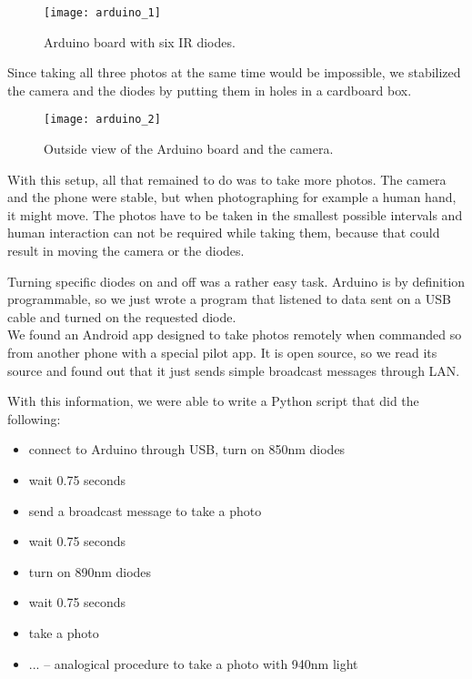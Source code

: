             \begin{figure}[H]
                \caption{Arduino board with six IR diodes.}
                \centering
                \texttt{[image: arduino\_1]}
                \label{fig:arduino_1}
            \end{figure}

            Since taking all three photos at the same time would be impossible,
            we stabilized the camera and the diodes by putting them in holes
            in a cardboard box.

            \begin{figure}[H]
                \caption{Outside view of the Arduino board and the camera.}
                \centering
                \texttt{[image: arduino\_2]}
                \label{fig:arduino_2}
            \end{figure}

            With this setup, all that remained to do was to take more photos.
            The camera and the phone were stable, but when photographing for example
            a human hand, it might move.
            The photos have to be taken in the smallest possible intervals
            and human interaction can not be required while taking them,
            because that could result in moving the camera or the diodes.

            Turning specific diodes on and off was a rather easy task.
            Arduino is by definition programmable, so we just wrote a program that
            listened to data sent on a USB cable and turned on the requested diode.\\
            We found an Android app \cite{opencameraremote} designed to take photos
            remotely when commanded so from another phone with a special pilot app.
            It is open source, so we read its source and found out that it just sends
            simple broadcast messages through LAN.

            With this information, we were able to write a Python script that did the
            following:

            \begin{itemize}
                \item connect to Arduino through USB, turn on 850nm diodes
                \item wait 0.75 seconds
                \item send a broadcast message to take a photo
                \item wait 0.75 seconds
                \item turn on 890nm diodes
                \item wait 0.75 seconds
                \item take a photo
                \item ... -- analogical procedure to take a photo with 940nm light
            \end{itemize}


